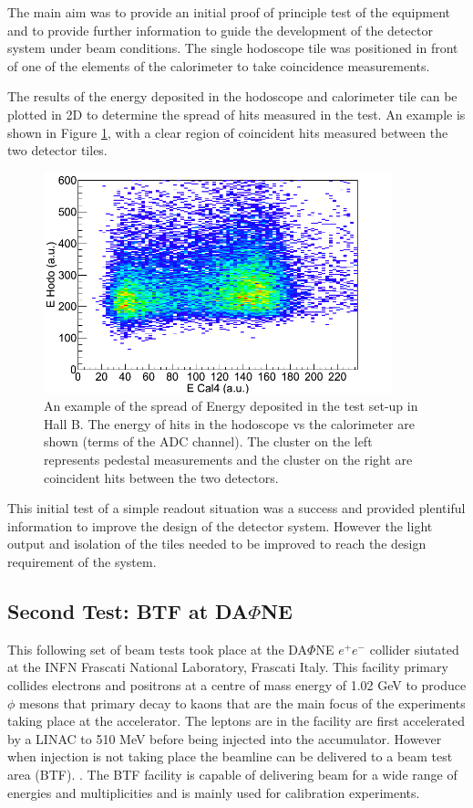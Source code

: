 The main aim was to provide an initial proof of principle test of the equipment and to provide further information to guide the development of the detector system under beam conditions. The single hodoscope tile was positioned in front of one of the elements of the calorimeter to take coincidence measurements.

The results of the energy deposited in the hodoscope and calorimeter tile can be plotted in 2D to determine the spread of hits measured in the test. An example is shown in Figure \ref{HallBTestResult}, with a clear region of coincident hits measured between the two detector tiles. 

\begin{figure}
	\centering
	\includegraphics[width=0.9\textwidth]{ImgChap1/HodoTest2}
	\caption{An example of the spread of Energy deposited in the test set-up in Hall B. The energy of hits in the hodoscope vs the calorimeter are shown (terms of the ADC channel). The cluster on the left represents pedestal measurements and the cluster on the right are coincident hits between the two detectors.}
	\label{HallBTestResult}
\end{figure}

This initial test of a simple readout situation was a success and provided plentiful information to improve the design of the detector system. However the light output and isolation of the tiles needed to be improved to reach the design requirement of the system.


\subsection{Second Test: BTF at DA$\Phi$NE}

This following set of beam tests took place at the DA$\Phi$NE $e^{+}e^{-}$ collider siutated at the INFN Frascati National Laboratory, Frascati Italy. This facility primary collides electrons and positrons at a centre of mass energy of 1.02 GeV to produce $\phi$ mesons that primary decay to kaons that are the main focus of the experiments taking place at the accelerator. The leptons are in the facility are first accelerated by a LINAC to 510 MeV before being injected into the accumulator. However when injection is not taking place the beamline can be delivered to a beam test area (BTF). \cite{mazzitelli2003commissioning}. The BTF facility is capable of delivering beam for a wide range of energies and multiplicities and is mainly used for calibration experiments.



